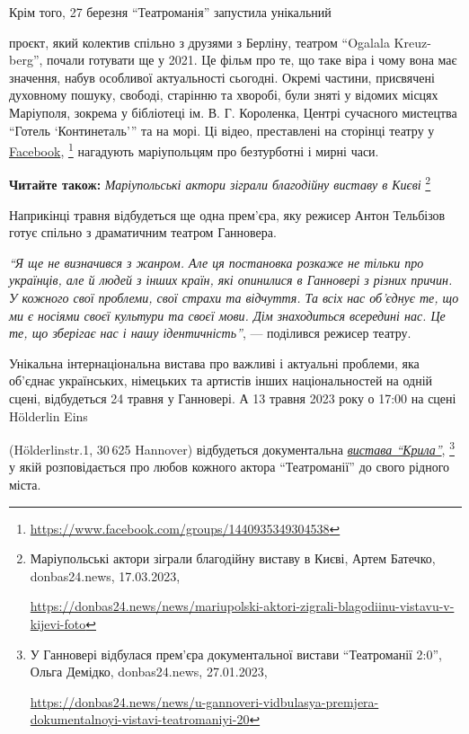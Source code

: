 
Крім того, 27 березня \enquote{Театроманія} запустила унікальний\par\noindent проєкт, який колектив
спільно з друзями з Берліну, театром \enquote{Ogalala Kreuz\hyp{}berg}, почали готувати ще у
2021. Це фільм про те, що таке віра і чому вона має значення, набув особливої
актуальності сьогодні. Окремі частини, присвячені духовному пошуку, свободі,
старінню та хворобі, були зняті у відомих місцях Маріуполя, зокрема у
бібліотеці ім. В. Г. Короленка, Центрі сучасного мистецтва \enquote{Готель
\enquote{Континеталь}} та на морі. Ці відео, преставлені на сторінці театру у \href{https://www.facebook.com/groups/1440935349304538}{Facebook},%
\footnote{\url{https://www.facebook.com/groups/1440935349304538}}
нагадують маріупольцям про безтурботні і мирні часи.

\textbf{Читайте також:} \emph{Маріупольські актори зіграли благодійну виставу в Києві}%
\footnote{Маріупольські актори зіграли благодійну виставу в Києві, Артем Батечко, donbas24.news, 17.03.2023, \par%
\url{https://donbas24.news/news/mariupolski-aktori-zigrali-blagodiinu-vistavu-v-kijevi-foto}%
}


Наприкінці травня відбудеться ще одна прем'єра, яку режисер Антон Тельбізов
готує спільно з драматичним театром Ганновера.

\begin{leftbar}
\emph{\enquote{Я ще не визначився з жанром. Але ця постановка розкаже не тільки про
українців, але й людей з інших країн, які опинилися в Ганновері з
різних причин. У кожного свої проблеми, свої страхи та відчуття. Та
всіх нас об'єднує те, що ми є носіями своєї культури та своєї мови. Дім
знаходиться всередині нас. Це те, що зберігає нас і нашу ідентичність}},
— поділився режисер театру.
\end{leftbar}

Унікальна інтернаціональна вистава про важливі і актуальні проблеми, яка
об'єднає українських, німецьких та артистів інших національностей на одній
сцені, відбудеться 24 травня у Ганновері. А 13 травня 2023 року о 17:00 на
сцені Hölderlin Eins\par\noindent	 (Hölderlinstr.1, 30 625 Hannover) відбудеться
документальна \href{https://donbas24.news/news/u-gannoveri-vidbulasya-premjera-dokumentalnoyi-vistavi-teatromaniyi-20}{\emph{вистава \enquote{Крила}}},%
\footnote{У Ганновері відбулася прем'єра документальної вистави \enquote{Театроманії 2:0}, Ольга Демідко, donbas24.news, 27.01.2023, \par\url{https://donbas24.news/news/u-gannoveri-vidbulasya-premjera-dokumentalnoyi-vistavi-teatromaniyi-20}}
у якій розповідається про любов кожного актора
\enquote{Театроманії} до свого рідного міста.

